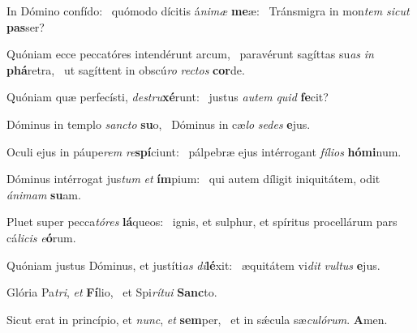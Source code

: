 \item In Dómino confído:~\pscross{} quómodo dícitis á\textit{ni}\textit{mæ} \textbf{me}æ:~\psstar{} Tránsmigra in mon\textit{tem} \textit{sic}\textit{ut} \textbf{pas}ser?
\item Quóniam ecce peccatóres intendérunt arcum,~\pscross{} paravérunt sagíttas su\textit{as} \textit{in} \textbf{phá}retra,~\psstar{} ut sagíttent in obscú\textit{ro} \textit{rec}\textit{tos} \textbf{cor}de.
\item Quóniam quæ perfecísti, \textit{de}\textit{stru}\textbf{xé}runt:~\psstar{} justus \textit{au}\textit{tem} \textit{quid} \textbf{fe}cit?
\item Dóminus in templo \textit{sanc}\textit{to} \textbf{su}o,~\psstar{} Dóminus in cæ\textit{lo} \textit{se}\textit{des} \textbf{e}jus.
\item Oculi ejus in páupe\textit{rem} \textit{re}\textbf{spí}ciunt:~\psstar{} pálpebræ ejus intérrogant \textit{fí}\textit{li}\textit{os} \textbf{hó}\textbf{mi}num.
\item Dóminus intérrogat jus\textit{tum} \textit{et} \textbf{ím}pium:~\psstar{} qui autem díligit iniquitátem, odit \textit{á}\textit{ni}\textit{mam} \textbf{su}am.
\item Pluet super pecca\textit{tó}\textit{res} \textbf{lá}queos:~\psstar{} ignis, et sulphur, et spíritus procellárum pars cá\textit{li}\textit{cis} \textit{e}\textbf{ó}rum.
\item Quóniam justus Dóminus, et justíti\textit{as} \textit{di}\textbf{lé}xit:~\psstar{} æquitátem vi\textit{dit} \textit{vul}\textit{tus} \textbf{e}jus.
\item Glória Pa\textit{tri}, \textit{et} \textbf{Fí}lio,~\psstar{} et Spi\textit{rí}\textit{tu}\textit{i} \textbf{Sanc}to.
\item Sicut erat in princípio, et \textit{nunc}, \textit{et} \textbf{sem}per,~\psstar{} et in sǽcula sæ\textit{cu}\textit{ló}\textit{rum}. \textbf{A}men.
